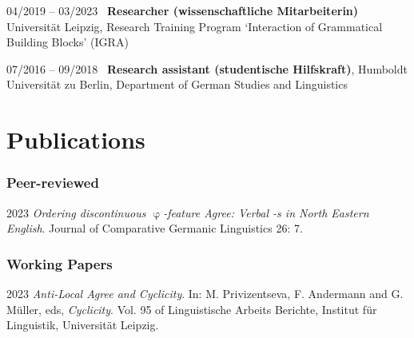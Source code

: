 \documentclass[11pt]{article}
\begin{document}
\begin{list}{}{
	\setlength{\leftmargin}{3.5cm}
	\setlength{\itemindent}{-2.5cm}
	}

	\item[04/2019 -- 03/2023~] \textbf{Researcher (wissenschaftliche Mitarbeiterin)} Universität Leipzig, Research Training Program `Interaction of Grammatical Building Blocks' (IGRA)
	
	\item[07/2016 -- 09/2018~] \textbf{Research assistant (studentische Hilfskraft)}, Humboldt Universität zu Berlin, Department of German Studies and Linguistics

\end{list}




\section*{Publications}
%	
\vspace{-1em}
\subsubsection*{Peer-reviewed}
\begin{list}{}{
		\setlength{\leftmargin}{3.5cm}
		\setlength{\itemindent}{-2.5cm}
	}
	
	\item[2023\phantom{~--~03/2022/04~}] \textit{Ordering discontinuous $\upvarphi$-feature Agree: Verbal -s in North Eastern English}. Journal of Comparative Germanic Linguistics 26: 7.
\end{list}

\vspace{-1em}
\subsubsection*{Working Papers}
\begin{list}{}{
		\setlength{\leftmargin}{3.5cm}
		\setlength{\itemindent}{-2.5cm}
	}
	
	\item[2023\phantom{~--~03/2022/04~}] \textit{Anti-Local Agree and Cyclicity}. In: M. Privizentseva, F. Andermann and G. Müller, eds, \textit{Cyclicity}. Vol. 95 of Linguistische Arbeits Berichte, Institut für Linguistik, Universität Leipzig.
\end{list}
\end{document}
